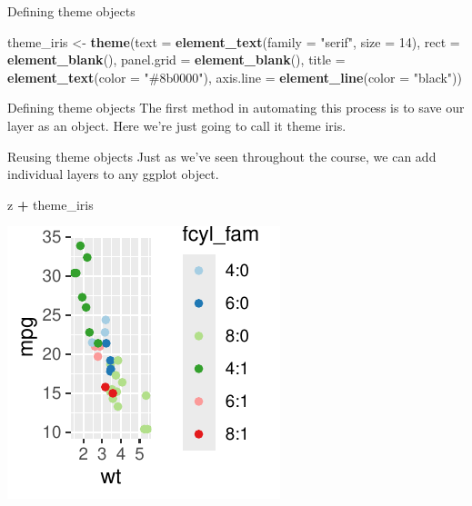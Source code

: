 \documentclass[
  ignorenonframetext,
]{beamer}
\newenvironment{Shaded}{\begin{snugshade}}{\end{snugshade}}
\newcommand{\AttributeTok}[1]{\textcolor[rgb]{0.13,0.29,0.53}{#1}}
\newcommand{\DecValTok}[1]{\textcolor[rgb]{0.00,0.00,0.81}{#1}}
\newcommand{\FunctionTok}[1]{\textcolor[rgb]{0.13,0.29,0.53}{\textbf{#1}}}
\newcommand{\NormalTok}[1]{#1}
\newcommand{\OtherTok}[1]{\textcolor[rgb]{0.56,0.35,0.01}{#1}}
\newcommand{\SpecialCharTok}[1]{\textcolor[rgb]{0.81,0.36,0.00}{\textbf{#1}}}
\newcommand{\StringTok}[1]{\textcolor[rgb]{0.31,0.60,0.02}{#1}}
\begin{document}
\begin{frame}[fragile]{Defining theme objects}

\begin{Shaded}
\begin{Highlighting}[]
\NormalTok{theme\_iris }\OtherTok{\textless{}{-}} \FunctionTok{theme}\NormalTok{(}\AttributeTok{text =} \FunctionTok{element\_text}\NormalTok{(}\AttributeTok{family =} \StringTok{"serif"}\NormalTok{, }\AttributeTok{size =} \DecValTok{14}\NormalTok{),}
    \AttributeTok{rect =} \FunctionTok{element\_blank}\NormalTok{(), }\AttributeTok{panel.grid =} \FunctionTok{element\_blank}\NormalTok{(), }\AttributeTok{title =} \FunctionTok{element\_text}\NormalTok{(}\AttributeTok{color =} \StringTok{"\#8b0000"}\NormalTok{),}
    \AttributeTok{axis.line =} \FunctionTok{element\_line}\NormalTok{(}\AttributeTok{color =} \StringTok{"black"}\NormalTok{))}
\end{Highlighting}
\end{Shaded}
\end{frame}

\begin{frame}{Defining theme objects}
\label{defining-theme-objects-3}
The first method in automating this process is to save our layer as an
object. Here we're just going to call it theme iris.
\end{frame}

\begin{frame}[fragile]{Reusing theme objects}
\label{reusing-theme-objects}
Just as we've seen throughout the course, we can add individual layers
to any ggplot object.

\begin{Shaded}
\begin{Highlighting}[]
\NormalTok{z }\SpecialCharTok{+}\NormalTok{ theme\_iris}
\end{Highlighting}
\end{Shaded}

\begin{center}\includegraphics[width=0.5\linewidth]{Figs/unnamed-chunk-77-1} \end{center}
\end{frame}
\end{document}
